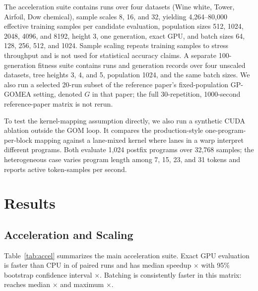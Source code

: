 \documentclass[conference]{IEEEtran}
\newcommand{\cpuoriginal}{\texttt{cpu\_original}}
\begin{document}
The acceleration suite contains \AccelerationRuns{} runs over four datasets
(Wine white, Tower, Airfoil, Dow chemical), sample scales 8, 16, and 32,
yielding 4,264--80,000 effective training samples per candidate evaluation,
population sizes 512, 1024, 2048, 4096, and 8192, height 3, one generation,
exact GPU, and batch sizes 64, 128, 256, 512, and 1024. Sample scaling repeats
training samples to stress throughput and is not used for statistical accuracy
claims. A separate 100-generation fitness suite contains \FitnessRuns{} runs and
\GenerationRecords{} generation records over four unscaled datasets, tree
heights 3, 4, and 5, population 1024, and the same batch sizes. We also run a
selected 20-run subset of the reference paper's fixed-population GP-GOMEA
setting, denoted \(G\) in that paper; the full 30-repetition, 1000-second
reference-paper matrix is not rerun.

To test the kernel-mapping assumption directly, we also run a synthetic CUDA
ablation outside the GOM loop. It compares the production-style
one-program-per-block mapping against a lane-mixed kernel where lanes in a warp
interpret different programs. Both evaluate 1,024 postfix programs over 32,768
samples; the heterogeneous case varies program length among 7, 15, 23, and 31
tokens and reports active token-samples per second.

\section{Results}

\subsection{Acceleration and Scaling}

Table~\ref{tab:accel} summarizes the main acceleration suite. Exact GPU
evaluation is faster than CPU in \ExactFasterFraction{} of paired runs and has
median speedup \ExactMedianSpeedup$\times$ with 95\% bootstrap confidence
interval \ExactSpeedupCI$\times$. Batching is consistently faster in this matrix:
\BestBatchVariant{} reaches median \BestBatchMedianSpeedup$\times$ and maximum
\BestBatchMaxSpeedup$\times$.

\begin{table}[t]
\centering
\caption{Acceleration-suite speedups relative to \cpuoriginal. Each row
summarizes 300 paired one-generation runs with 4,264--80,000 effective training
samples per candidate evaluation.}
\label{tab:accel}
\resizebox{\columnwidth}{!}{}
\end{table}
\end{document}
